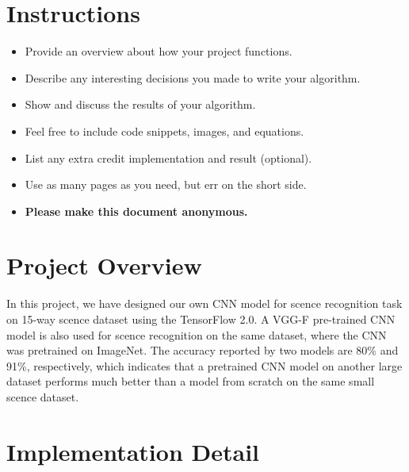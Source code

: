 \section*{Instructions}
\begin{itemize}
    \item Provide an overview about how your project functions.
    \item Describe any interesting decisions you made to write your algorithm.
    \item Show and discuss the results of your algorithm.
    \item Feel free to include code snippets, images, and equations.
    \item List any extra credit implementation and result (optional).
    \item Use as many pages as you need, but err on the short side.
    \item \textbf{Please make this document anonymous.}
\end{itemize}

\section*{Project Overview}

In this project, we have designed our own CNN model for scence recognition task on 15-way scence dataset using the TensorFlow 2.0. A VGG-F pre-trained CNN model is also used for scence recognition on the same dataset, where the CNN was pretrained on ImageNet. The accuracy reported by two models are 80\% and 91\%, respectively, which indicates that a pretrained CNN model on another large dataset performs much better than a model from scratch on the same small scence dataset.

\section*{Implementation Detail}

